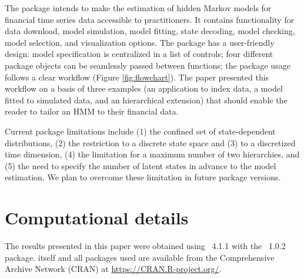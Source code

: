\documentclass[article]{jss}
\begin{document}
The  package intends to make the estimation of hidden Markov models for financial time series data accessible to practitioners. It contains functionality for data download, model simulation, model fitting, state decoding, model checking, model selection, and visualization options. The package has a user-friendly design: model specification is centralized in a list of controls; four different package objects can be seamlessly passed between functions; the package usage follows a clear workflow (Figure \ref{fig:flowchart}). The paper presented this workflow on a basis of three examples (an application to index data, a model fitted to simulated data, and an hierarchical extension) that should enable the reader to tailor an HMM to their financial data.

Current package limitations include (1) the confined set of state-dependent distributions, (2) the restriction to a discrete state space and (3) to a discretized time dimension, (4) the limitation for a maximum number of two hierarchies, and (5) the need to specify the number of latent states in advance to the model estimation. We plan to overcome these limitation in future package versions.


\section*{Computational details}

The results presented in this paper were obtained using
~4.1.1 with the
~1.0.2 package.  itself
and all packages used are available from the Comprehensive
 Archive Network (CRAN) at \url{https://CRAN.R-project.org/}.



\end{document}
